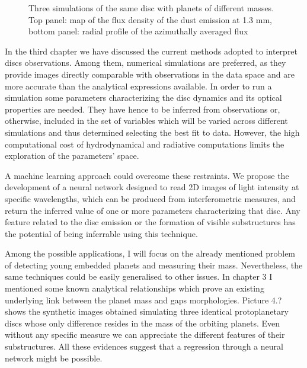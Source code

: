 \documentclass[a4paper,10pt]{report}
\begin{document}
\begin{figure}
    \begin{center}
        \scalebox{0.5}{}
        \scalebox{0.6}{}
    \end{center}
    \caption{Three simulations of the same disc with planets of different masses.
    Top panel: map of the flux density of the dust emission at 1.3 mm, bottom panel:
    radial profile of the azimuthally averaged flux}
\end{figure}

In the third chapter we have discussed the current methods adopted to interpret discs observations.
Among them, numerical simulations are preferred, as they provide images
directly comparable with observations in the data space and are more accurate than the analytical expressions available.
In order to run a simulation some parameters characterizing the disc dynamics and its optical properties are needed.
They have hence to be inferred from observations or, otherwise, included in the set of variables which will be varied across different simulations
and thus determined selecting the best fit to data. However, the high computational cost of hydrodynamical and radiative 
computations limits the exploration of the parameters' space.

A machine learning approach could overcome these restraints. We propose the development
of a neural network designed to read 2D images of light intensity at specific wavelengths,
which can be produced from interferometric measures, and return the inferred value of one or more 
parameters characterizing that disc. Any feature related to the disc emission or the formation of visible substructures 
has the potential of being inferrable using this technique.

Among the possible applications, I will focus on the already mentioned problem of detecting young embedded planets and measuring their mass.
Nevertheless, the same techniques could be easily generalised to other issues.
In chapter 3 I mentioned some known analytical relationships which prove an existing underlying link
between the planet mass and gaps morphologies. Picture 4.? shows the synthetic images obtained simulating
three identical protoplanetary discs whose only difference resides in the mass of the orbiting planets. 
Even without any specific measure we can appreciate the different features of their substructures.
All these evidences suggest that a regression through a neural network might be possible.
\end{document}
